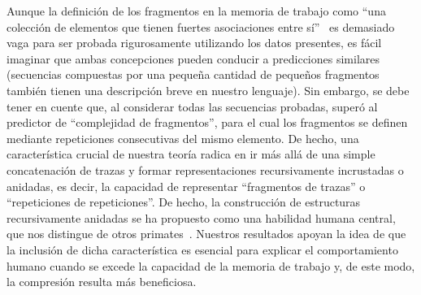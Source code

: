 Aunque la definición de los fragmentos en la memoria de trabajo como ``una colección de elementos que tienen fuertes asociaciones entre sí''~\cite{f25,f110} es demasiado vaga para ser probada rigurosamente utilizando los datos presentes, es fácil imaginar que ambas concepciones pueden conducir a predicciones similares (secuencias compuestas por una pequeña cantidad de pequeños fragmentos también tienen una descripción breve en nuestro lenguaje). Sin embargo, se debe tener en cuente que, al considerar todas las secuencias probadas, \mdlbin superó al predictor de ``complejidad de fragmentos'', para el cual los fragmentos se definen mediante repeticiones consecutivas del mismo elemento. De hecho, una característica crucial de nuestra teoría radica en ir más allá de una simple concatenación de trazas y formar representaciones recursivamente incrustadas o anidadas, es decir, la capacidad de representar ``fragmentos de trazas'' o ``repeticiones de repeticiones''. De hecho, la construcción de estructuras recursivamente anidadas se ha propuesto como una habilidad humana central, que nos distingue de otros primates~\cite{f4,f6,f7,f111}. Nuestros resultados apoyan la idea de que la inclusión de dicha característica es esencial para explicar el comportamiento humano cuando se excede la capacidad de la memoria de trabajo y, de este modo, la compresión resulta más beneficiosa.



